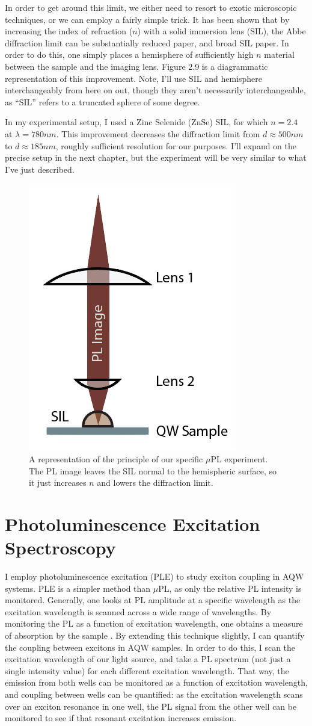 \indent In order to get around this limit, we either need to resort to exotic microscopic techniques, or we can employ a fairly simple trick. It has been shown that by increasing the index of refraction ($n$) with a solid immersion lens (SIL), the Abbe diffraction limit can be substantially reduced  \cite{yoshitaapp} paper, and broad SIL paper. In order to do this, one simply places a hemisphere of sufficiently high $n$ material between the sample and the imaging lens. Figure 2.9 is a diagrammatic representation of this improvement. Note, I'll use SIL and hemisphere interchangeably from here on out, though they aren't necessarily interchangeable, as ``SIL'' refers to a truncated sphere of some degree. 

\indent In my experimental setup, I used a Zinc Selenide (ZnSe) SIL, for which $n = 2.4$ at $\lambda = 780 nm$. This improvement decreases the diffraction limit from $d \approx 500nm$ to $ d \approx 185 nm$, roughly sufficient resolution for our purposes. I'll expand on the precise setup in the next chapter, but the experiment will be very similar to what I've just described.
\begin{figure}[h!]
\label{confocal2}
\centering
\includegraphics[width = .3\textwidth]{confocal2.png}
\caption{\doublespacing A representation of the principle of our specific $\mu$PL experiment. The PL image leaves the SIL normal to the hemispheric surface, so it just increases $n$ and lowers the diffraction limit.}
\end{figure}


\section{Photoluminescence Excitation Spectroscopy}
\indent I employ photoluminescence excitation (PLE) to study exciton coupling in AQW systems. PLE is a simpler method than $\mu$PL, as only the relative PL intensity is monitored. Generally, one looks at PL amplitude at a specific wavelength as the excitation wavelength is scanned across a wide range of wavelengths. By monitoring the PL as a function of excitation wavelength, one obtains a measure of absorption by the sample \cite{fox}. By extending this technique slightly, I can quantify the coupling between excitons in AQW samples. In order to do this, I scan the excitation wavelength of our light source, and take a PL spectrum (not just a single intensity value) for each different excitation wavelength. That way, the emission from both wells can be monitored as a function of excitation wavelength, and coupling between wells can be quantified: as the excitation wavelength scans over an exciton resonance in one well, the PL signal from the other well can be monitored to see if that resonant excitation increases emission.
